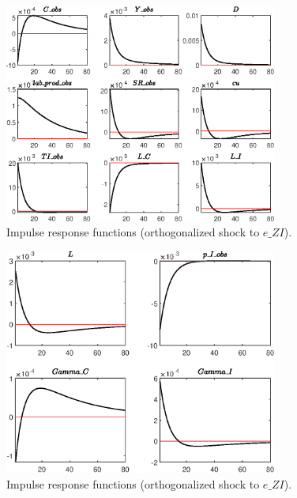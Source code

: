  
\begin{figure}[H]
\centering 
\includegraphics[width=0.80\textwidth]{directed_search/graphs/directed_search_IRF_e_ZI1}
\caption{Impulse response functions (orthogonalized shock to $e\_ZI$).}\label{Fig:IRF:e_ZI:1}
\end{figure}
 
\begin{figure}[H]
\centering 
\includegraphics[width=0.80\textwidth]{directed_search/graphs/directed_search_IRF_e_ZI2}
\caption{Impulse response functions (orthogonalized shock to $e\_ZI$).}\label{Fig:IRF:e_ZI:2}
\end{figure}
 
